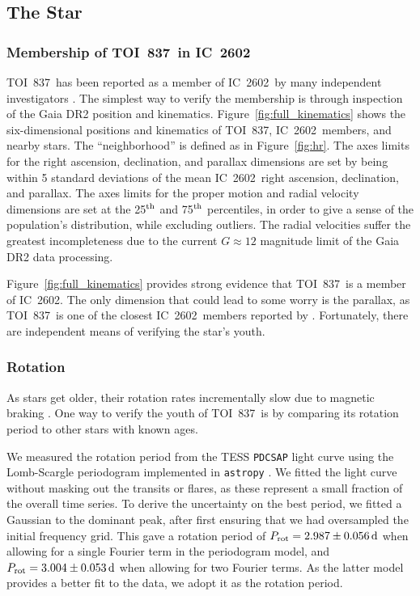 \documentclass[12pt,twocolumn,tighten]{aastex63}
\newcommand{\tn}{TOI~837} %
\newcommand{\cn}{IC~2602} %
\begin{document}
\subsection{The Star}
\label{subsec:star}

%

\subsubsection{Membership of \tn\ in \cn}
\label{subsec:member}

\tn\ has been reported as a member of \cn\ by many independent
investigators \citep[{\it
e.g.},][]{Kharchenko_et_al_2013,oh_comoving_2017,cantatgaudin_gaia_2018,damiani_stellar_2019,kounkel_untangling_2019}.
The simplest way to verify the membership is through inspection of the
Gaia DR2 position and kinematics.  Figure~\ref{fig:full_kinematics}
shows the six-dimensional positions and kinematics of \tn, \cn\
members, and nearby stars.  The ``neighborhood'' is defined as in
Figure~\ref{fig:hr}.  The axes limits for the right ascension,
declination, and parallax dimensions are set by being within 5
standard deviations of the mean \cn\ right ascension, declination, and
parallax.  The axes limits for the proper motion and radial velocity
dimensions are set at the 25$^{\rm th}$ and 75$^{\rm th}$ percentiles,
in order to give a sense of the population's distribution, while
excluding outliers.  The radial velocities suffer the greatest
incompleteness due to the current $G\approx12$ magnitude limit of the
Gaia DR2 data processing.

Figure~\ref{fig:full_kinematics} provides strong evidence that \tn\ is
a member of \cn.  The only dimension that could lead to some worry is
the parallax, as \tn\ is one of the closest \cn\ members reported by
\citet{cantatgaudin_gaia_2018}.  Fortunately, there are independent
means of verifying the star's youth.

\subsubsection{Rotation}

As stars get older, their rotation rates incrementally slow due to
magnetic braking \cite{weber_angular_1967,skumanich_time_1972}.  One
way to verify the youth of \tn\ is by comparing its rotation period to
other stars with known ages.

We measured the rotation period from the TESS \texttt{PDCSAP} light
curve using the Lomb-Scargle periodogram implemented in
\texttt{astropy}
\citep{lomb_1976,scargle_studies_1982,vanderplas_periodograms_2015}.
We fitted the light curve without masking out the transits or flares,
as these represent a small fraction of the overall time series.  To
derive the uncertainty on the best period, we fitted a Gaussian to the
dominant peak, after first ensuring that we had oversampled the
initial frequency grid.  This gave a rotation period of $P_{\rm rot} =
2.987 \pm 0.056\,{\rm d}$ when allowing for a single Fourier term in
the periodogram model, and $P_{\rm rot} = 3.004 \pm 0.053\,{\rm d}$
when allowing for two Fourier terms.  As the latter model provides a
better fit to the data, we adopt it as the rotation period.
\end{document}
